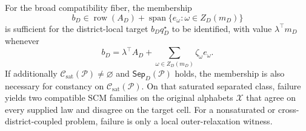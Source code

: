 For the broad compatibility fiber, the membership
\[
b_D\in\operatorname{row}(A_D)+\operatorname{span}\{e_\omega:\omega\in Z_D(m_D)\}
\]
is sufficient for the district-local target \(b_Dq_D^\star\) to be identified, with value \(\lambda^\top m_D\) whenever
\[
b_D=\lambda^\top A_D+\sum_{\omega\in Z_D(m_D)}\zeta_\omega e_\omega.
\]
If additionally \(\mathcal C_{\mathrm{sat}}(\mathcal P)\ne\varnothing\) and \(\mathsf{Sep}_D(\mathcal P)\) holds, the membership is also necessary for constancy on \(\mathcal C_{\mathrm{sat}}(\mathcal P)\). On that saturated separated class, failure yields two compatible SCM families on the original alphabets \(\mathcal X\) that agree on every supplied law and disagree on the target cell. For a nonsaturated or cross-district-coupled problem, failure is only a local outer-relaxation witness.
